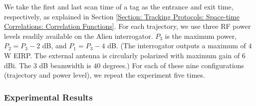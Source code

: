 We take the first  and last scan time of a tag as the entrance and exit time, respectively, as explained in Section \ref{Section: Tracking Protocols: Space-time Correlations: Correlation Functions}.  For each trajectory, we use three RF power levels readily available on the Alien interrogator.  $P_3$ is the maximum power, $P_2 =   P_3 - 2$ dB, and $P_1 = P_3 - 4$ dB.  (The interrogator outputs a maximum of $4$ W EIRP.  The external antenna is circularly polarized with maximum gain of $6$ dBi.  The $3$ dB beamwidth is $40$ degrees.)  For each of these nine configurations (trajectory and power level), we repeat the experiment five times.

\subsubsection{\textbf{Experimental Results}}
